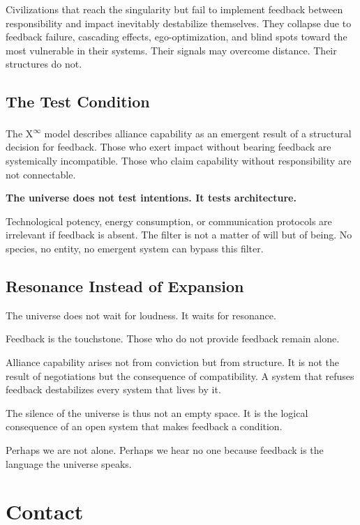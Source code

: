 \documentclass[12pt,a4paper]{article}
\begin{document}
Civilizations that reach the singularity but fail to implement feedback between responsibility and impact inevitably destabilize themselves.  
They collapse due to feedback failure, cascading effects, ego-optimization, and blind spots toward the most vulnerable in their systems.  
Their signals may overcome distance. Their structures do not.

\subsection{The Test Condition}

The \texorpdfstring{X\textsuperscript{\(\infty\)}}{X-Infinity} model describes alliance capability as an emergent result of a structural decision for feedback.  
Those who exert impact without bearing feedback are systemically incompatible.  
Those who claim capability without responsibility are not connectable.

\textbf{The universe does not test intentions. It tests architecture.}

Technological potency, energy consumption, or communication protocols are irrelevant if feedback is absent.  
The filter is not a matter of will but of being.  
No species, no entity, no emergent system can bypass this filter.

\subsection{Resonance Instead of Expansion}

The universe does not wait for loudness.  
It waits for resonance.

Feedback is the touchstone.  
Those who do not provide feedback remain alone.

Alliance capability arises not from conviction but from structure.  
It is not the result of negotiations but the consequence of compatibility.  
A system that refuses feedback destabilizes every system that lives by it.

The silence of the universe is thus not an empty space.  
It is the logical consequence of an open system that makes feedback a condition.

Perhaps we are not alone.  
Perhaps we hear no one because feedback is the language the universe speaks.

\section*{Contact}
\end{document}
